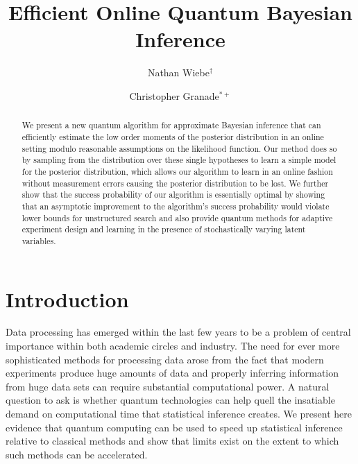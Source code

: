 \documentclass[aps,amsmath,onecolumn,amssymb]{revtex4}
\begin{document}
\newcommand{\id}{\openone}


\title{Efficient Online Quantum Bayesian Inference}
\author{Nathan Wiebe$^\dagger$}
\author{Christopher Granade$^{*+}$}
\begin{abstract}
We present a new quantum algorithm for approximate Bayesian inference that can efficiently estimate the low order moments of the posterior distribution in an online setting modulo reasonable assumptions on the likelihood function.  Our method does so by sampling from the distribution over these single hypotheses to learn a simple model for the posterior distribution, which allows our algorithm to learn in an online fashion without measurement errors causing the posterior distribution to be lost.  We further show that the success probability of our algorithm is essentially optimal by showing that an asymptotic improvement to the algorithm's success probability would violate lower bounds for unstructured search and also provide quantum methods for adaptive experiment design and learning in the presence of stochastically varying latent variables.\end{abstract}
\maketitle
\section{Introduction}
Data processing has emerged within the last few years to be a problem of central importance within both academic circles and industry.  The need for ever more sophisticated methods for processing data arose from the fact that modern experiments produce huge amounts of data and properly inferring information from huge data sets can require substantial computational power.  A natural question to ask is whether quantum technologies can help quell the insatiable demand on computational time that statistical inference creates.  We present here evidence that quantum computing can be used to speed up statistical inference relative to classical methods and show that limits exist on the extent to which such methods can be accelerated.  
\end{document}
